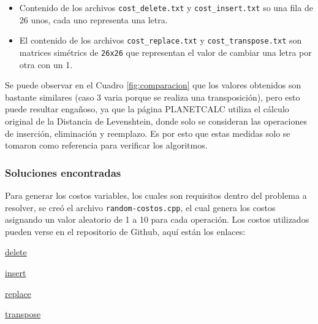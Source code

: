 \begin{itemize}
   \item Contenido de los archivos \texttt{cost\_delete.txt} y \texttt{cost\_insert.txt} so una fila de 26 unos, cada uno representa una letra.
   \item El contenido de los archivos \texttt{cost\_replace.txt} y \texttt{cost\_transpose.txt} son matrices simétrics de \texttt{26x26} que representan el valor de cambiar una letra por otra con un 1. 
\end{itemize}

Se puede observar en el Cuadro \ref{fig:comparacion} que los valores obtenidos son bastante similares (caso 3 varia porque se realiza una transposición), pero esto puede resultar engañoso, ya que la página PLANETCALC utiliza el cálculo original de la Distancia de Levenshtein, donde solo se consideran las operaciones de inserción, eliminación y reemplazo. Es por esto que estas medidas solo se tomaron como referencia para verificar los algoritmos.

\subsubsection{Soluciones encontradas}
Para generar los costos variables, los cuales son requisitos dentro del problema a resolver, se creó el archivo \texttt{random-costos.cpp}, el cual genera los costos asignando un valor aleatorio de 1 a 10 para cada operación. Los costos utilizados pueden verse en el repositorio de Github, aquí están los enlaces:

\begin{itemize}
    \begin{minipage}{0.5\textwidth}
        \item \href{https://github.com/luphin/Tarea2y3Algoritmos-FB-PD/blob/main/codigos/cost_delete.txt}{delete}
        \item \href{https://github.com/luphin/Tarea2y3Algoritmos-FB-PD/blob/main/codigos/cost_insert.txt}{insert}
    \end{minipage}%
    \begin{minipage}{0.5\textwidth}
        \item \href{https://github.com/luphin/Tarea2y3Algoritmos-FB-PD/blob/main/codigos/cost_replace.txt}{replace}
        \item \href{https://github.com/luphin/Tarea2y3Algoritmos-FB-PD/blob/main/codigos/cost_transpose.txt}{transpose}
    \end{minipage}
\end{itemize}


